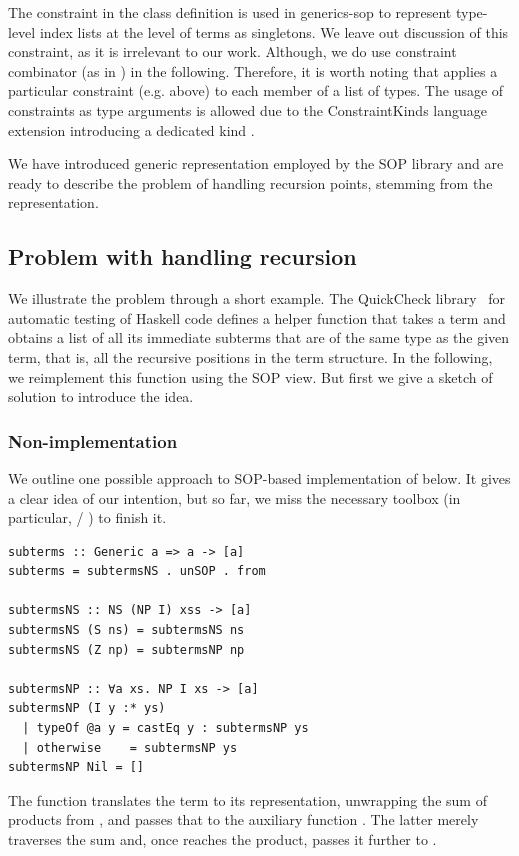 \documentclass[sigplan,screen,review,anonymous]{acmart}
\begin{document}
The  constraint in the  class definition is used in \textsf{generics-sop} to represent type-level index lists at the level of terms as singletons. We leave out discussion of this constraint, as it is irrelevant to our work. Although, we do use  constraint combinator (as in ) in the following. Therefore, it is worth noting that  applies a particular constraint (e.g.  above) to each member of a list of types. The usage of constraints as type arguments is allowed due to the \textsf{ConstraintKinds} language extension introducing a dedicated kind .

We have introduced generic representation employed by the SOP library and are ready to describe the problem of handling recursion points, stemming from the representation. 

\subsection{Problem with handling recursion}
\label{subsec:recursion-problem}

We illustrate the problem through a short example. The \textsf{QuickCheck} library~\cite{Claessen2011} for automatic testing of Haskell code defines a helper function  that takes a term and obtains a list of all its immediate subterms that are of the same type as the given term, that is, all the recursive positions in the term structure. In the following, we reimplement this function using the SOP view. But first we give a sketch of solution to introduce the idea.

\subsubsection{Non-implementation}

We outline one possible approach to SOP-based implementation of  below. It gives a clear idea of our intention, but so far, we miss the necessary toolbox (in particular,  / ) to finish it.
\begin{lstlisting}[style=fancy]
subterms :: Generic a => a -> [a]
subterms = subtermsNS . unSOP . from

subtermsNS :: NS (NP I) xss -> [a]
subtermsNS (S ns) = subtermsNS ns
subtermsNS (Z np) = subtermsNP np

subtermsNP :: ∀a xs. NP I xs -> [a]
subtermsNP (I y :* ys)
  | typeOf @a y = castEq y : subtermsNP ys
  | otherwise    = subtermsNP ys
subtermsNP Nil = []
\end{lstlisting}
The function  translates the term to its representation, unwrapping the sum of products from , and passes that to the auxiliary function . The latter merely traverses the sum and, once reaches the product,  passes it further to .
\end{document}
